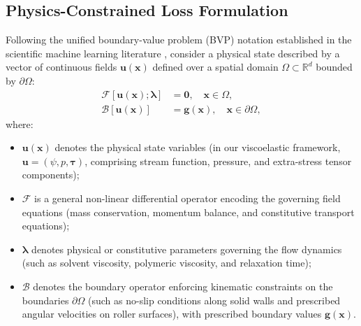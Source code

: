 \subsection{Physics-Constrained Loss Formulation}
\label{subsec:pinn_loss_formulation}

Following the unified boundary-value problem (BVP) notation established in the scientific machine learning literature \cite{cuomo2022scientific}, consider a physical state described by a vector of continuous fields $\boldsymbol{u}(\boldsymbol{x})$ defined over a spatial domain $\Omega \subset \mathbb{R}^d$ bounded by $\partial \Omega$:
\begin{align}
    \mathcal{F}[\boldsymbol{u}(\boldsymbol{x}); \boldsymbol{\lambda}] &= \boldsymbol{0} , \quad \boldsymbol{x} \in \Omega , \label{eq:general_pde_operator} \\
    \mathcal{B}[\boldsymbol{u}(\boldsymbol{x})] &= \boldsymbol{g}(\boldsymbol{x}) , \quad \boldsymbol{x} \in \partial \Omega , \label{eq:general_bc_operator}
\end{align}
where:
\begin{itemize}
    \item $\boldsymbol{u}(\boldsymbol{x})$ denotes the physical state variables (in our viscoelastic framework, $\boldsymbol{u} = (\psi, p, \boldsymbol{\tau})$, comprising stream function, pressure, and extra-stress tensor components);
    \item $\mathcal{F}$ is a general non-linear differential operator encoding the governing field equations (mass conservation, momentum balance, and constitutive transport equations);
    \item $\boldsymbol{\lambda}$ denotes physical or constitutive parameters governing the flow dynamics (such as solvent viscosity, polymeric viscosity, and relaxation time);
    \item $\mathcal{B}$ denotes the boundary operator enforcing kinematic constraints on the boundaries $\partial \Omega$ (such as no-slip conditions along solid walls and prescribed angular velocities on roller surfaces), with prescribed boundary values $\boldsymbol{g}(\boldsymbol{x})$.
\end{itemize}


